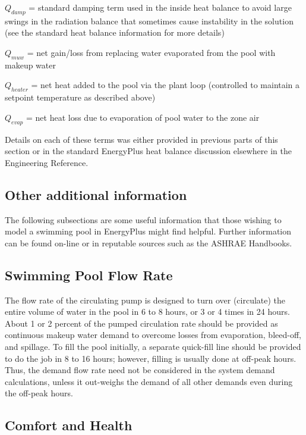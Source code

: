 \(Q_{damp}\) = standard damping term used in the inside heat balance to avoid large swings in the radiation balance that sometimes cause instability in the solution (see the standard heat balance information for more details)

\(Q_{muw}\) = net gain/loss from replacing water evaporated from the pool with makeup water

\(Q_{heater}\) = net heat added to the pool via the plant loop (controlled to maintain a setpoint temperature as described above)

\(Q_{evap}\) = net heat loss due to evaporation of pool water to the zone air

Details on each of these terms was either provided in previous parts of this section or in the standard EnergyPlus heat balance discussion elsewhere in the Engineering Reference.

\subsection{Other additional information}\label{other-additional-information}

The following subsections are some useful information that those wishing to model a swimming pool in EnergyPlus might find helpful. Further information can be found on-line or in reputable sources such as the ASHRAE Handbooks.

\subsection{Swimming Pool Flow Rate}\label{swimming-pool-flow-rate}

The flow rate of the circulating pump is designed to turn over (circulate) the entire volume of water in the pool in 6 to 8 hours, or 3 or 4 times in 24 hours. About 1 or 2 percent of the pumped circulation rate should be provided as continuous makeup water demand to overcome losses from evaporation, bleed-off, and spillage. To fill the pool initially, a separate quick-fill line should be provided to do the job in 8 to 16 hours; however, filling is usually done at off-peak hours. Thus, the demand flow rate need not be considered in the system demand calculations, unless it out-weighs the demand of all other demands even during the off-peak hours.

\subsection{Comfort and Health}\label{comfort-and-health}

